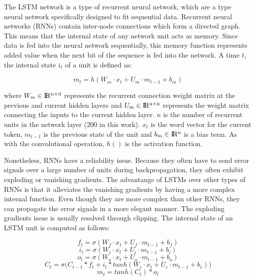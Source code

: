 \documentclass[10pt,conference,compsocconf]{IEEEtran}
\begin{document}
The LSTM network is a type of recurrent neural network, which are a type neural network specifically designed to fit sequential data. Recurrent neural networks (RNNs) contain inter-node connections which form a directed graph. This means that the internal state of any network unit acts as memory. Since data is fed into the neural network sequentially, this memory function represents added value when the next bit of the sequence is fed into the network. A time $t$, the internal state $i_t$ of a unit is defined as:

\begin {dmath} \label{eq:convolution}
m_t = h (   W_m \cdot x_t + U_m \cdot m_{t-1} + b_m  )
\end{dmath}

where $W_m \in \rm I\!R ^{n \times d}$ represents the recurrent connection weight matrix at the previous and current hidden layers and $U_m \in \rm I\!R ^{n \times n}$ represents the weight matrix connecting the inputs to the current hidden layer. $n$ is the number of recurrent units in the network layer (200 in this work). $x_t$ is the word vector for the current token, $m_{t-1}$ is the previous state of the unit and $b_m \in \rm I\!R ^ n$ is a bias term. As with the convolutional operation, $h()$ is the activation function.

Nonetheless, RNNs have a reliability issue. Because they often have to send error signals over a large number of units during backpropagation, they often exhibit exploding or vanishing gradients. The advantange of LSTMs over other types of RNNs is that it alleviates the vanishing gradients by having a more complex internal function. Even though they are more complex than other RNNs, they can propagate the error signals in a more elegant manner.  The exploding gradients issue is usually resolved through clipping. The internal state of an LSTM unit is computed as follows:

\begin {dmath} \label{eq:lstm1}
f_t = \sigma ( W_f \cdot x_t + U_f \cdot m_{t-1} + b_f  )
\end{dmath}
\begin {dmath} \label{eq:lstm2}
i_t = \sigma ( W_i \cdot x_t + U_i \cdot m_{t-1} + b_i )
\end{dmath}
\begin {dmath} \label{eq:lstm3}
o_t = \sigma ( W_o \cdot x_t + U_o \cdot m_{t-1} + b_o )
\end{dmath}
\begin {dmath} \label{eq:lstm4}
C_t = \sigma \Big(C_{t-1} * f_t  + i_t * tanh(W_c \cdot x_t + U_c \cdot m_{t-1} + b_c)\Big)
\end{dmath}
\begin {dmath} \label{eq:lstm5}
m_t = tanh(C_t) * o_t
\end{dmath}
\end{document}
